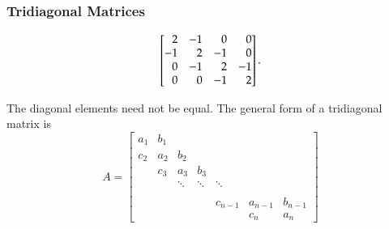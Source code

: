 \documentclass[10pt]{beamer}
\begin{document}
\begin{frame}
\frametitle{Tridiagonal Matrices}

\begin{equation*}
\left[\begin{array}{@{}rrrr@{}}
2 & -1 & 0 & 0\\
-1 & 2 & -1 & 0\\
0 & -1 & 2 & -1\\
0 & 0 & -1 & 2
\end{array}\right].
\end{equation*}

The diagonal elements need not be equal.  The general
form of a tridiagonal matrix is
\begin{equation*}
    A = \begin{bmatrix}
    a_1 & b_1 & & & & &\\
    c_2 & a_2 & b_2& & & &\\
    & c_3 & a_3 & b_3& & &\\
    & & \ddots & \ddots & \ddots& &\\
    \\
    & & & & c_{n-1}& a_{n-1}& b_{n-1}\\
    & & & & & c_n & a_n
    \end{bmatrix}
\end{equation*}




\end{frame}
\end{document}
